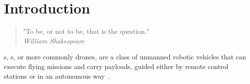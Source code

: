 
%

%



\chapter{Introduction}%
\label{cha:introduction}
%
%
\begin{quote}
\begin{flushright}
    "To be, or not to be, that is the question." \\
    \emph{William Shakespeare}
\end{flushright}
\end{quote}
  

s, s, or more commonly drones, are a class of
unmanned robotic vehicles that can execute flying missions and carry payloads,
guided either by remote control stations or in an autonomous
way~\cite{alladi2022UAVBlockain,glossner2021overview}.


